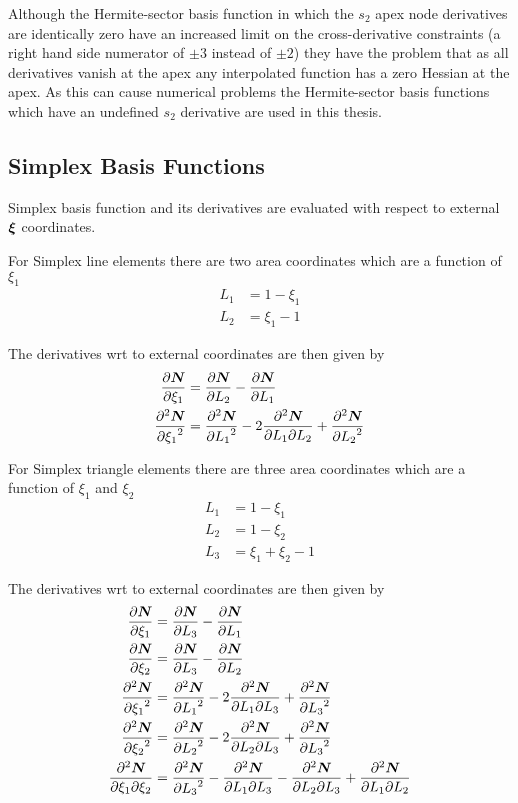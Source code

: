 Although the Hermite-sector basis function in which the $s_{2}$ apex node
derivatives are identically zero have an increased limit on the
cross-derivative constraints (a right hand side numerator of $\pm 3$ instead
of $\pm 2$) they have the problem that as all derivatives vanish at the apex
any interpolated function has a zero Hessian at the apex. As this can cause
numerical problems the Hermite-sector basis functions which have an undefined
$s_{2}$ derivative are used in this thesis.


\subsection{Simplex Basis Functions}

Simplex basis function and its derivatives are evaluated with respect to external $\vect{\xi}$ coordinates.

For Simplex line elements there are two area coordinates which are a function of $\xi_{1}$ \ie
\begin{align}
  L_{1} &= 1 - \xi_{1} \\
  L_{2} &= \xi_{1} - 1
\end{align}

The derivatives wrt to external coordinates are then given by 
\begin{align}
  \delby{\vect{\sbfnsymb{}}}{\xi_{1}} &= \delby{\vect{\sbfnsymb{}}}{L_{2}}-\delby{\vect{\sbfnsymb{}}}{L_{1}} \\
  \deltwosqby{\vect{\sbfnsymb{}}}{\xi_{1}} &= \deltwosqby{\vect{\sbfnsymb{}}}{L_{1}}-
  2\deltwoby{\vect{\sbfnsymb{}}}{L_{1}}{L_{2}}+\deltwosqby{\vect{\sbfnsymb{}}}{L_{2}}
\end{align}

For Simplex triangle elements there are three area coordinates which are a function of $\xi_{1}$ and
$\xi_{2}$ \ie
\begin{align} 
  L_{1} &= 1 - \xi_{1} \\
  L_{2} &= 1 - \xi_{2} \\
  L_{3} &= \xi_{1} + \xi_{2} - 1 
\end{align}

The derivatives wrt to external coordinates are then given by 
\begin{align}
  \delby{\vect{\sbfnsymb{}}}{\xi_{1}} &= \delby{\vect{\sbfnsymb{}}}{L_{3}}-\delby{\vect{\sbfnsymb{}}}{L_{1}} \\
  \delby{\vect{\sbfnsymb{}}}{\xi_{2}} &= \delby{\vect{\sbfnsymb{}}}{L_{3}}-\delby{\vect{\sbfnsymb{}}}{L_{2}} \\
  \deltwosqby{\vect{\sbfnsymb{}}}{\xi_{1}} &= \deltwosqby{\vect{\sbfnsymb{}}}{L_{1}}- 
  2\deltwoby{\vect{\sbfnsymb{}}}{L_{1}}{L_{3}}+\deltwosqby{\vect{\sbfnsymb{}}}{L_{3}} \\
  \deltwosqby{\vect{\sbfnsymb{}}}{\xi_{2}} &= \deltwosqby{\vect{\sbfnsymb{}}}{L_{2}}- 
  2\deltwoby{\vect{\sbfnsymb{}}}{L_{2}}{L_{3}}+\deltwosqby{\vect{\sbfnsymb{}}}{L_{3}} \\
  \deltwoby{\vect{\sbfnsymb{}}}{\xi_{1}}{\xi_{2}} &= \deltwosqby{\vect{\sbfnsymb{}}}{L_{3}}-
  \deltwoby{\vect{\sbfnsymb{}}}{L_{1}}{L_{3}}-\deltwoby{\vect{\sbfnsymb{}}}{L_{2}}{L_{3}}+
  \deltwoby{\vect{\sbfnsymb{}}}{L_{1}}{L_{2}}
\end{align}
  
